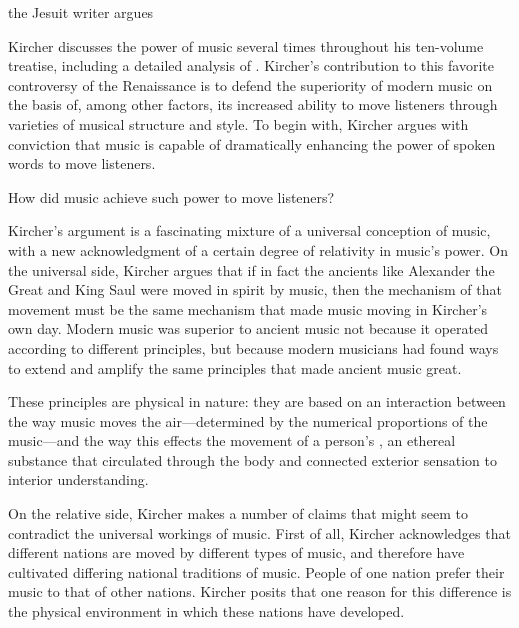 the Jesuit writer argues

Kircher discusses the power of music several times throughout his ten-volume treatise, including a detailed analysis of .%
  \Autocite[bk.~VII, Erothema VI, 549]{Kircher:Musurgia}
Kircher's contribution to this favorite controversy of the Renaissance is to defend the superiority of modern music on the basis of, among other factors, its increased ability to move listeners through varieties of musical structure and style.
To begin with, Kircher argues with conviction that music is capable of dramatically enhancing the power of spoken words to move listeners.

How did music achieve such power to move listeners?


Kircher's argument is a fascinating mixture of a universal conception of music, with a new acknowledgment of a certain degree of relativity in music's power.
On the universal side, Kircher argues that if in fact the ancients like Alexander the Great and King Saul were moved in spirit by music, then the mechanism of that movement must be the same mechanism that made music moving in Kircher's own day.
Modern music was superior to ancient music not because it operated according to different principles, but because modern musicians had found ways to extend and amplify the same principles that made ancient music great.

These principles are physical in nature: they are based on an interaction between the way music moves the air---determined by the numerical proportions of the music---and the way this effects the movement of a person's , an ethereal substance that circulated through the body and connected exterior sensation to interior understanding. %


On the relative side, Kircher makes a number of claims that might seem to contradict the universal workings of music.
First of all, Kircher acknowledges that different nations are moved by different types of music, and therefore have cultivated differing national traditions of music.
People of one nation prefer their music to that of other nations.
Kircher posits that one reason for this difference is the physical environment in which these nations have developed. %

